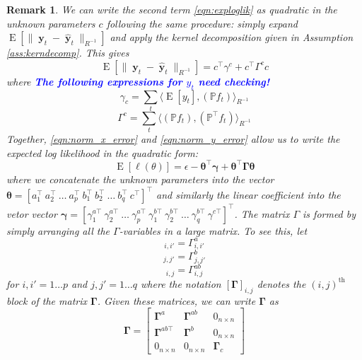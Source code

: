 \documentclass{IEEEtran}
\newcommand{\todo}[1]{\textsf{\emph{\textbf{\textcolor{blue}{#1}}}}}
\newcommand{\inner}[3]{\langle#1,#2\rangle_{#3}}
\newcommand{\dist}[2]{\|#1\|_{#2}}
\DeclareMathOperator{\E}{E}
\DeclareMathOperator{\yvec}{\mathbf{y}}
\newtheorem{remark}{Remark}
\begin{document}
\begin{remark}
We can write the second term \ref{eqn:exploglik} as quadratic in the unknown parameters $c$ following the same procedure: simply expand $\E[\dist{\yvec_t-\hat{\yvec}_t}{R^{-1}}]$ and apply the kernel decomposition given in Assumption \ref{ass:kerndecomp}. This gives
\begin{equation}
	\label{eqn:norm_y_error}
	\E[\dist{\yvec_t-\hat{\yvec}_t}{R^{-1}}] = c^\top \gamma^c + c^\top \Gamma^c c
\end{equation}
where \todo{The following expressions for $y_t$ need checking!}
\begin{equation}
	\gamma_c = \sum_t \inner
	{\E[y_t]}
	{(\mathbb{P} f_t)}
	{R^{-1}}
\end{equation}
\begin{equation}
	 \Gamma^c = \sum_t \inner
		{(\mathbb{P} f_t)}
		{(\mathbb{P}^\top f_t)}
		{R^{-1}}
\end{equation}
Together, \ref{eqn:norm_x_error} and \ref{eqn:norm_y_error} allow us to write the expected log likelihood in the quadratic form:
\begin{equation}
	\E[\ell(\theta)] = \epsilon - \boldsymbol{\theta}^\top \boldsymbol{\gamma} + \boldsymbol{\theta}^\top \boldsymbol{\Gamma} \boldsymbol{\theta}
\end{equation}
where we concatenate the unknown parameters into the vector $\boldsymbol{\theta} = [a_1^\top ~ a_2^\top ~ \ldots ~ a_p^\top ~ b_1^\top ~ b_2^\top ~ \ldots ~ b_q^\top ~ c^\top]^\top$ and similarly the linear coefficient into the vetor vector $\boldsymbol{\gamma} = [\gamma^{a\top}_1 ~ \gamma^{a\top}_2 ~ \ldots ~ \gamma^{a\top}_p ~ \gamma^{b\top}_1 ~ \gamma^{b\top}_2 ~ \ldots ~ \gamma^{b\top}_q ~ \gamma^{c\top}]^\top$. The matrix $\Gamma$ is formed by simply arranging all the $\Gamma$-variables in a large matrix. To see this, let 
\begin{equation}
	[\boldsymbol{\Gamma}^a]_{i,i'} = \Gamma_{i,i'}^a 
\end{equation}
\begin{equation}
	[\boldsymbol{\Gamma}^b]_{j,j'} = \Gamma_{j,j'}^b 
\end{equation}
\begin{equation}
	[\boldsymbol{\Gamma}^{ab}]_{i,j} = \Gamma_{i,j}^{ab}
\end{equation}
for $i,i' = 1 \ldots p$ and $j,j' = 1 \ldots q$ where the notation $[\boldsymbol{\Gamma}]_{i,j}$ denotes the $(i,j)^\mathrm{th}$ block of the matrix $\boldsymbol{\Gamma}$. Given these matrices, we can write $\boldsymbol{\Gamma}$ as 
\begin{equation}
	\boldsymbol{\Gamma} = \begin{bmatrix}
		\boldsymbol{\Gamma}^a & \boldsymbol{\Gamma}^{ab} & 0_{n\times n} \\
		\boldsymbol{\Gamma}^{ab\top} & \boldsymbol{\Gamma}^{b} & 0_{n\times n} \\
		0_{n\times n} & 0_{n\times n} & \boldsymbol{\Gamma}_c
	\end{bmatrix}
\end{equation}


\end{remark}
\end{document}

